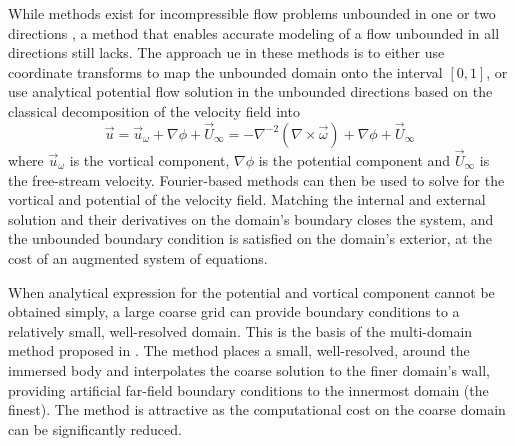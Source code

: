 \documentclass{article}
\begin{document}
While methods exist for incompressible flow problems unbounded in one \cite{Grosch1977NumericalTransforms, Levy2022SolvingMethod} or two directions \cite{Rennich1997NumericalDirections}, a method that enables accurate modeling of a flow unbounded in all directions still lacks. The approach ue in these methods is to either use coordinate transforms to map the unbounded domain onto the interval $[0,1]$, or use analytical potential flow solution in the unbounded directions based on the classical decomposition of the velocity field into
\begin{equation}
    \vec{u} = \vec{u}_\omega + \nabla\phi + \vec{U}_\infty = -\nabla^{-2}\left(\nabla \times \vec{\omega}\right) + \nabla\phi + \vec{U}_\infty
\end{equation}
where $\vec{u}_\omega$ is the vortical component, $\nabla\phi$ is the potential component and $\vec{U}_\infty$ is the free-stream velocity. Fourier-based methods can then be used to solve for the vortical and potential of the velocity field. Matching the internal and external solution and their derivatives on the domain's boundary closes the system, and the unbounded boundary condition is satisfied on the domain's exterior, at the cost of an augmented system of equations.


When analytical expression for the potential and vortical component cannot be obtained simply, a large coarse grid can provide boundary conditions to a relatively small, well-resolved domain. This is the basis of the multi-domain method proposed in \cite{Colonius2008}. The method places a small, well-resolved, around the immersed body and interpolates the coarse solution to the finer domain's wall, providing artificial far-field boundary conditions to the innermost domain (the finest). The method is attractive as the computational cost on the coarse domain can be significantly reduced. 
\end{document}
